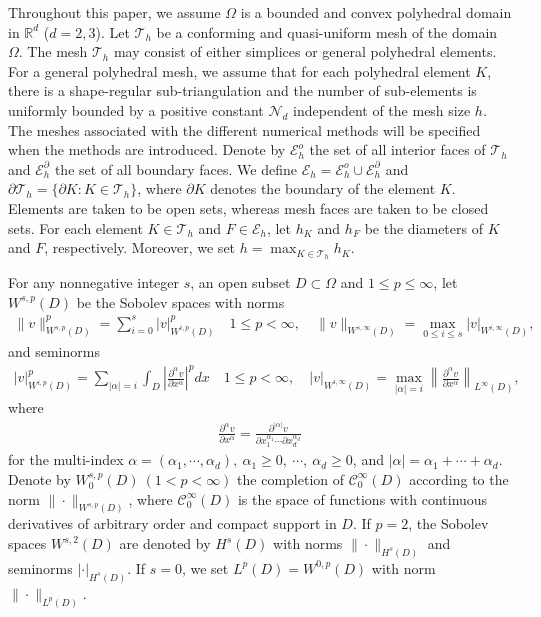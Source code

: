 \documentclass[1996/10/24]{amsart}
\theoremstyle{definition}
\numberwithin{equation}{section}
\begin{document}
Throughout this paper, we assume $\Omega$ is a bounded and convex polyhedral domain in $\mathbb{R}^{d}$ ($d=2,3$).
Let $\mathcal{T}_h$ be a conforming and quasi-uniform mesh of the domain $\Omega$.
The mesh $\mathcal{T}_{h}$ may consist of either simplices or general polyhedral elements.
For a general polyhedral mesh, we assume that for each polyhedral
element $K$, there is a shape-regular sub-triangulation and the number of sub-elements is uniformly
bounded by a positive constant $\mathcal{N}_d$ independent of the mesh size $h$.
The meshes associated with the different numerical methods will be specified when the methods are introduced.
Denote by $\mathcal{E}_h^o$ the set of all interior faces of $\mathcal{T}_h$
and $\mathcal{E}_h^{\partial}$ the set of all boundary faces.
We define $\mathcal{E}_h=\mathcal{E}_h^o\cup\mathcal{E}_h^{\partial}$ and
$\partial\mathcal{T}_h=\{\partial K: K\in\mathcal{T}_h\}$, where $\partial K$ denotes
the boundary of the element $K$.
Elements are taken to be open sets, whereas mesh faces are taken to be closed sets.
For each element $K\in\mathcal{T}_h$ and $F\in\mathcal{E}_h$, let $h_K$
and $h_F$ be the diameters of $K$ and $F$, respectively. Moreover, we set $h=\max_{K\in\mathcal{T}_h}h_K$.

For any nonnegative integer $s$, an open subset $D\subset\Omega$ and $1\leq p\leq \infty$, let $W^{s,p}(D)$ be the Sobolev spaces \cite{a1975} with
norms
\begin{align*}
\|v\|_{W^{s,p}(D)}^p=\sum_{i=0}^s|v|_{W^{i,p}(D)}^p\quad 1\leq p<\infty,\quad \|v\|_{W^{s,\infty}(D)}=\max_{0\leq i\leq s}|v|_{W^{i,\infty}(D)},
\end{align*}
and seminorms
\begin{align*}
|v|^p_{W^{i,p}(D)}=\sum_{|\alpha|=i}\int_D\left|\frac{\partial^{\alpha}v}{\partial x^{\alpha}}\right|^p dx\quad 1\leq p<\infty,\quad
|v|_{W^{i,\infty}(D)}=\max_{|\alpha|=i}\left\|\frac{\partial^{\alpha}v}{\partial x^{\alpha}}\right\|_{L^{\infty}(D)},
\end{align*}
where
\begin{align*}
\frac{\partial^{\alpha}v}{\partial x^{\alpha}}=\frac{\partial^{|\alpha|}v}{\partial x_1^{\alpha_1}\cdots\partial x_d^{\alpha_d}}
\end{align*}
for the multi-index $\alpha=(\alpha_1,\cdots,\alpha_d),~\alpha_1\geq 0,~\cdots,~\alpha_d\geq 0$, and $|\alpha|=\alpha_1+\cdots+\alpha_d$.
Denote by $W_0^{s,p}(D)~(1<p<\infty)$ the completion of $\mathcal{C}_0^{\infty}(D)$ according to the norm $\|\cdot\|_{W^{s,p}(D)}$, where
$\mathcal{C}_0^{\infty}(D)$ is the space of functions with continuous derivatives of arbitrary order and compact support in $D$. If $p=2$, the
Sobolev spaces $W^{s,2}(D)$ are denoted by $H^s(D)$ with norms $\|\cdot\|_{H^s(D)}$ and seminorms $|\cdot|_{H^s(D)}$. If $s=0$, we set $L^p(D)=W^{0,p}(D)$
with norm $\|\cdot\|_{L^p(D)}$.
\end{document}
